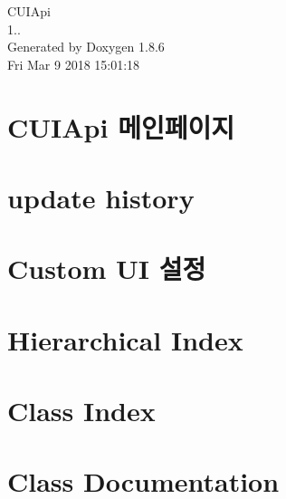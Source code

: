 \documentclass[twoside]{book}
\newcommand{\clearemptydoublepage}{%
  \newpage{\pagestyle{empty}\cleardoublepage}%
}
\begin{document}
\hypersetup{pageanchor=false}
\begin{titlepage}
\vspace*{7cm}
\begin{center}%
{\Large C\-U\-I\-Api \\[1ex]\large 1.. }\\
\vspace*{1cm}
{\large Generated by Doxygen 1.8.6}\\
\vspace*{0.5cm}
{\small Fri Mar 9 2018 15:01:18}\\
\end{center}
\end{titlepage}
\clearemptydoublepage
\tableofcontents
\clearemptydoublepage
{}
\hypersetup{pageanchor=true}

\chapter{C\-U\-I\-Api 메인페이지}
\label{index}\hypertarget{index}{}
\chapter{update history}
\label{md_CuiHistory}
\hypertarget{md_CuiHistory}{}

\chapter{Custom U\-I 설정}
\label{md_CustomDoc}
\hypertarget{md_CustomDoc}{}

\chapter{Hierarchical Index}

\chapter{Class Index}

\chapter{Class Documentation}

















\newpage
{}
{}
\printindex
\end{document}
